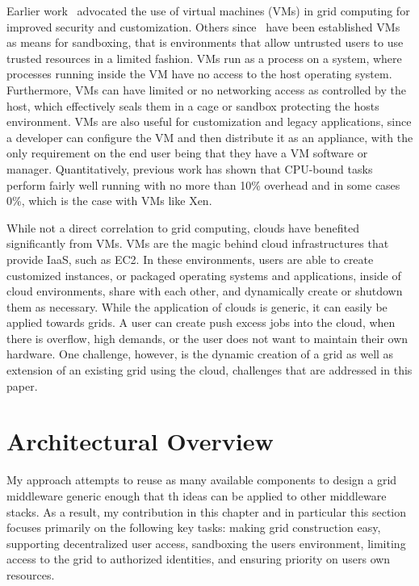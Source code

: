 Earlier work~\cite{fig_grid} advocated the use of virtual machines (VMs) in
grid computing for improved security and customization.  Others
since~\cite{sandbox, dve, ourgrid_paper} have been established VMs as means for
sandboxing, that is environments that allow untrusted users to use trusted
resources in a limited fashion.  VMs run as a process on a system, where
processes running inside the VM have no access to the host operating system.
Furthermore, VMs can have limited or no networking access as controlled by the
host, which effectively seals them in a cage or sandbox protecting the hosts
environment.  VMs are also useful for customization and legacy applications,
since a developer can configure the VM and then distribute it as an appliance,
with the only requirement on the end user being that they have a VM software or
manager.  Quantitatively, previous work has shown that CPU-bound tasks perform
fairly well running with no more than 10\% overhead and in some cases 0\%,
which is the case with VMs like Xen.

While not a direct correlation to grid computing, clouds have benefited
significantly from VMs.  VMs are the magic behind cloud infrastructures that
provide IaaS, such as EC2.  In these environments, users are able to create
customized instances, or packaged operating systems and applications, inside of
cloud environments, share with each other, and dynamically create or shutdown
them as necessary.  While the application of clouds is generic, it can easily
be applied towards grids.  A user can create push excess jobs into the cloud,
when there is overflow, high demands, or the user does not want to maintain
their own hardware.  One challenge, however, is the dynamic creation of a grid
as well as extension of an existing grid using the cloud, challenges that are
addressed in this paper.

\section{Architectural Overview}
\label{architecture}

My approach attempts to reuse as many available components to design a grid
middleware generic enough that th ideas can be applied to other middleware
stacks.  As a result, my contribution in this chapter and in particular this
section focuses primarily on the following key tasks:  making grid construction
easy, supporting decentralized user access, sandboxing the users environment,
limiting access to the grid to authorized identities, and ensuring priority on
users own resources.  

